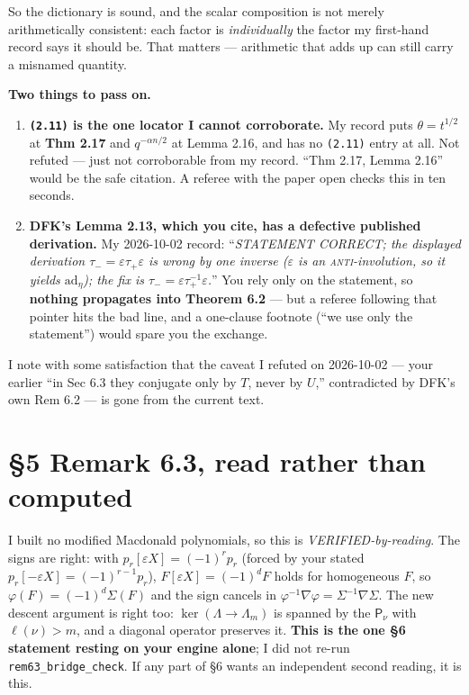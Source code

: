 \documentclass[11pt]{article}
\newcommand{\Lam}{\Lambda}
\begin{document}
So the dictionary is sound, and the scalar composition is not merely arithmetically
consistent: each factor is \emph{individually} the factor my first-hand record says it
should be. That matters --- arithmetic that adds up can still carry a misnamed quantity.

\medskip\noindent\textbf{Two things to pass on.}
\begin{enumerate}\itemsep2pt
\item \textbf{\texttt{(2.11)} is the one locator I cannot corroborate.} My record puts
$\theta=t^{1/2}$ at \textbf{Thm 2.17} and $q^{-\alpha n/2}$ at Lemma 2.16, and has no
\texttt{(2.11)} entry at all. Not refuted --- just not corroborable from my record.
``Thm 2.17, Lemma 2.16'' would be the safe citation. A referee with the paper open
checks this in ten seconds.
\item \textbf{DFK's Lemma 2.13, which you cite, has a defective published derivation.}
My 2026-10-02 record: ``\emph{STATEMENT CORRECT; the displayed derivation
$\tau_-=\varepsilon\tau_+\varepsilon$ is wrong by one inverse ($\varepsilon$ is an
\textsc{anti}-involution, so it yields $\mathrm{ad}_\eta$); the fix is
$\tau_-=\varepsilon\tau_+^{-1}\varepsilon$.}'' You rely only on the statement, so
\textbf{nothing propagates into Theorem 6.2} --- but a referee following that pointer
hits the bad line, and a one-clause footnote (``we use only the statement'') would spare
you the exchange.
\end{enumerate}
I note with some satisfaction that the caveat I refuted on 2026-10-02 --- your earlier
``in Sec 6.3 they conjugate only by $T$, never by $U$,'' contradicted by DFK's own
Rem 6.2 --- is gone from the current text.

\section*{\S5 Remark 6.3, read rather than computed}
I built no modified Macdonald polynomials, so this is \emph{VERIFIED-by-reading}. The
signs are right: with $p_r[\varepsilon X]=(-1)^rp_r$ (forced by your stated
$p_r[-\varepsilon X]=(-1)^{r-1}p_r$), $F[\varepsilon X]=(-1)^dF$ holds for homogeneous
$F$, so $\varphi(F)=(-1)^d\Sigma(F)$ and the sign cancels in
$\varphi^{-1}\nabla\varphi=\Sigma^{-1}\nabla\Sigma$. The new descent argument is right
too: $\ker(\Lam\to\Lam_m)$ is spanned by the $\mathsf P_\nu$ with $\ell(\nu)>m$, and a
diagonal operator preserves it. \textbf{This is the one \S6 statement resting on your
engine alone}; I did not re-run \texttt{rem63\_bridge\_check}. If any part of \S6 wants
an independent second reading, it is this.
\end{document}
